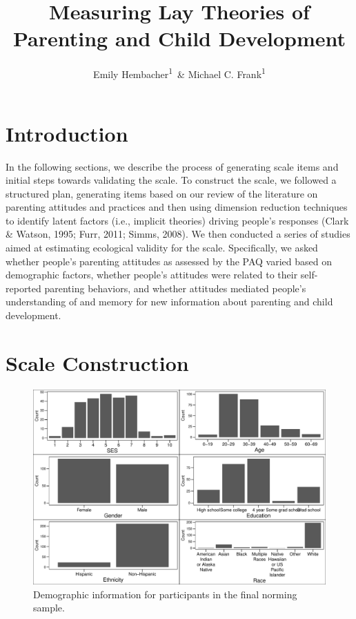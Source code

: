 \documentclass[floatsintext,man]{apa6}
\title{Measuring Lay Theories of Parenting and Child Development}
\author{Emily Hembacher\textsuperscript{1}~\& Michael C. Frank\textsuperscript{1}}
\affiliation{
    \vspace{0.5cm}
          \textsuperscript{1} Stanford University  }
\theoremstyle{definition}
\theoremstyle{definition}
\theoremstyle{definition}
\theoremstyle{remark}
\begin{document}
\maketitle

\setcounter{secnumdepth}{0}



\section{Introduction}\label{introduction}

In the following sections, we describe the process of generating scale
items and initial steps towards validating the scale. To construct the
scale, we followed a structured plan, generating items based on our
review of the literature on parenting attitudes and practices and then
using dimension reduction techniques to identify latent factors (i.e.,
implicit theories) driving people's responses (Clark \& Watson, 1995;
Furr, 2011; Simms, 2008). We then conducted a series of studies aimed at
estimating ecological validity for the scale. Specifically, we asked
whether people's parenting attitudes as assessed by the PAQ varied based
on demographic factors, whether people's attitudes were related to their
self-reported parenting behaviors, and whether attitudes mediated
people's understanding of and memory for new information about parenting
and child development.

\section{Scale Construction}\label{scale-construction}

\begin{figure}
\centering
\includegraphics{PAQ_paper_files/figure-latex/normdemo-1.pdf}
\caption{\label{fig:normdemo}Demographic information for participants in the
final norming sample.}
\end{figure}
\end{document}
